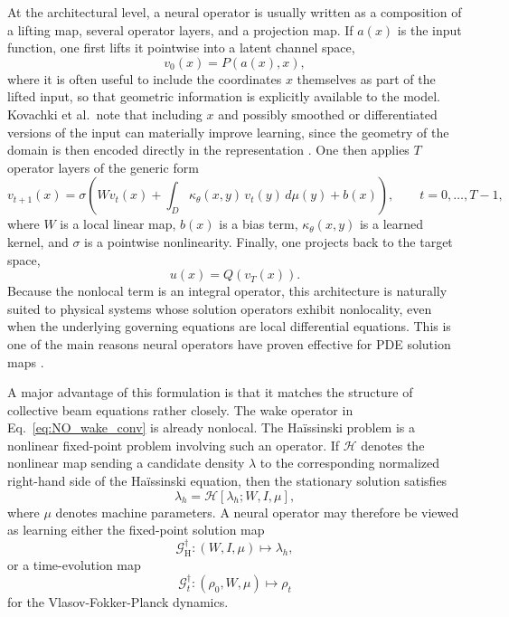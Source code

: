 \documentclass[11pt,a4paper]{article}
\begin{document}
\begin{sloppypar}
At the architectural level, a neural operator is usually written as a composition of a lifting map, several operator layers, and a projection map. If \(a(x)\) is the input function, one first lifts it pointwise into a latent channel space,
\begin{equation}
v_0(x) = P(a(x),x),
\label{eq:NO_lift}
\end{equation}
where it is often useful to include the coordinates \(x\) themselves as part of the lifted input, so that geometric information is explicitly available to the model. Kovachki et al.\ note that including \(x\) and possibly smoothed or differentiated versions of the input can materially improve learning, since the geometry of the domain is then encoded directly in the representation \cite{kovachki_neural_nodate}. One then applies \(T\) operator layers of the generic form
\begin{equation}
v_{t+1}(x)
=
\sigma\!\left(
Wv_t(x)
+
\int_D \kappa_{\theta}(x,y)\,v_t(y)\,d\mu(y)
+
b(x)
\right),
\qquad t=0,\dots,T-1,
\label{eq:NO_layer_full}
\end{equation}
where \(W\) is a local linear map, \(b(x)\) is a bias term, \(\kappa_\theta(x,y)\) is a learned kernel, and \(\sigma\) is a pointwise nonlinearity. Finally, one projects back to the target space,
\begin{equation}
u(x) = Q(v_T(x)).
\label{eq:NO_project}
\end{equation}
Because the nonlocal term is an integral operator, this architecture is naturally suited to physical systems whose solution operators exhibit nonlocality, even when the underlying governing equations are local differential equations. This is one of the main reasons neural operators have proven effective for PDE solution maps \cite{kovachki_neural_nodate,kossaifi_library_2026}.

A major advantage of this formulation is that it matches the structure of collective beam equations rather closely. The wake operator in Eq.~\eqref{eq:NO_wake_conv} is already nonlocal. The Ha\"issinski problem is a nonlinear fixed-point problem involving such an operator. If \(\mathcal H\) denotes the nonlinear map sending a candidate density \(\lambda\) to the corresponding normalized right-hand side of the Ha\"issinski equation, then the stationary solution satisfies
\begin{equation}
\lambda_h = \mathcal H[\lambda_h;W,I,\mu],
\label{eq:NO_haissinski_fixedpoint}
\end{equation}
where \(\mu\) denotes machine parameters. A neural operator may therefore be viewed as learning either the fixed-point solution map
\begin{equation}
\mathcal G^\dagger_{\mathrm H} : (W,I,\mu) \mapsto \lambda_h,
\label{eq:NO_haissinski_operator}
\end{equation}
or a time-evolution map
\begin{equation}
\mathcal G^\dagger_t : (\rho_0,W,\mu) \mapsto \rho_t
\label{eq:NO_VFP_operator}
\end{equation}
for the Vlasov-Fokker-Planck dynamics. 


\end{sloppypar}
\end{document}
